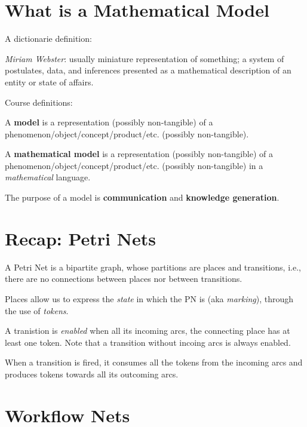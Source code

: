 
\section*{What is a Mathematical Model}

A dictionarie definition:

\begin{definition}
	\emph{Miriam Webster}: usually miniature representation of something; a system of postulates, data, and inferences presented as a mathematical description of an entity or state of affairs.
\end{definition}

Course definitions:

\begin{definition}
	A \textbf{model} is a representation (possibly non-tangible) of a phenomenon/object/concept/product/etc. (possibly non-tangible).
\end{definition}

\begin{definition}
	A \textbf{mathematical model} is a representation (possibly non-tangible) of a phenomenon/object/concept/product/etc. (possibly non-tangible) in a \emph{mathematical} language.
\end{definition}

The purpose of a model is \textbf{communication} and \textbf{knowledge generation}.

\section*{Recap: Petri Nets}

A Petri Net is a bipartite graph, whose partitions are places and transitions, i.e., there are no connections between places nor between transitions.

Places allow us to express the \emph{state} in which the PN is (aka \emph{marking}), through the use of \emph{tokens}.

A tranistion is \emph{enabled} when all its incoming arcs, the connecting place has at least one token. Note that a transition without incoing arcs is always enabled.

When a transition is fired, it consumes all the tokens from the incoming arcs and produces tokens towards all its outcoming arcs.

\section*{Workflow Nets}


